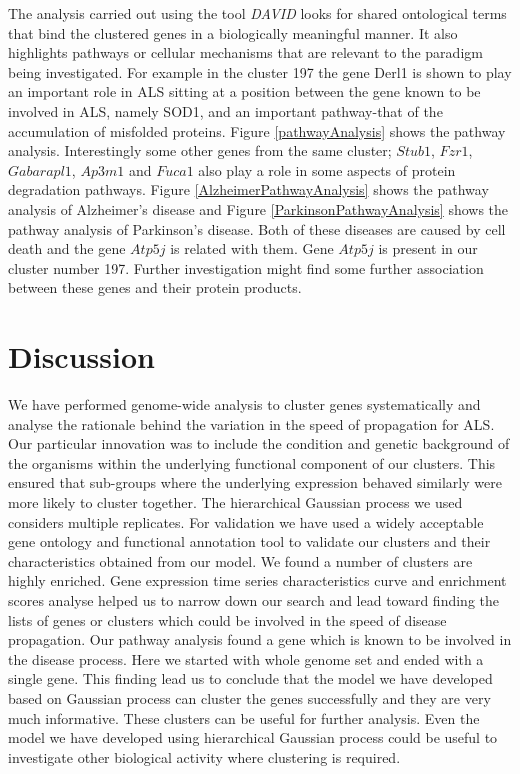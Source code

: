 The analysis carried out using the tool \emph{DAVID} looks for shared ontological terms that bind the clustered genes in a biologically meaningful manner. It also highlights pathways or cellular mechanisms that are relevant to the paradigm being investigated. For example in the cluster 197 the gene Derl1 is shown to play an important role in ALS sitting at a position between the gene known to be involved in ALS, namely SOD1, and an important pathway-that of the accumulation of misfolded proteins. Figure \ref{pathwayAnalysis} shows the pathway analysis. Interestingly some other genes from the same cluster; $Stub1$, $Fzr1$, $Gabarapl1$, $Ap3m1$ and $Fuca1$ also play a role in some aspects of protein degradation pathways. Figure \ref{AlzheimerPathwayAnalysis} shows the pathway analysis of Alzheimer's disease and Figure \ref{ParkinsonPathwayAnalysis} shows the pathway analysis of Parkinson's disease. Both of these diseases are caused by cell death and the gene $Atp5j$ is related with them. Gene $Atp5j$ is present in our cluster number 197. Further investigation might find some further association between these genes and their protein products.

\section{Discussion}
We have performed genome-wide analysis to cluster genes systematically and analyse the rationale behind the variation in the speed of propagation for ALS. Our particular innovation was to include the condition and genetic background of the organisms within the underlying functional component of our clusters. This ensured that sub-groups where the underlying expression behaved similarly were more likely to cluster together. The hierarchical Gaussian process we used considers multiple replicates. For validation we have used a widely acceptable gene ontology and functional annotation tool to validate our clusters and their characteristics obtained from our model. We found a number of clusters are highly enriched. Gene expression time series characteristics curve and enrichment scores analyse helped us to narrow down our search and lead toward finding the lists of genes or clusters which could be involved in the speed of disease propagation. Our pathway analysis found a gene which is known to be involved in the disease process. Here we started with whole genome set and ended with a single gene. This finding lead us to conclude that the model we have developed based on Gaussian process can cluster the genes successfully and they are very much informative. These clusters can be useful for further analysis.  Even the model we have developed using hierarchical Gaussian process could be useful to investigate other biological activity where clustering is required. 
